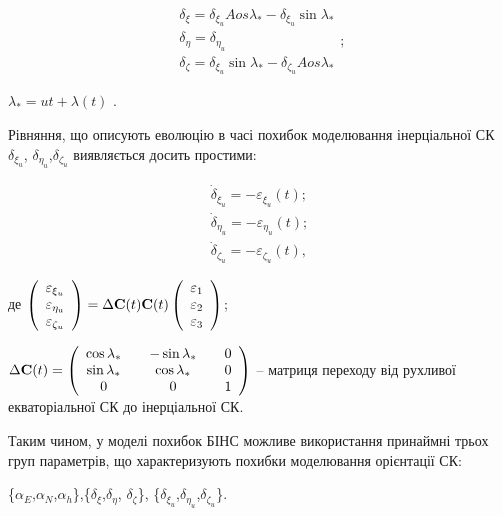 \[\begin{array}{l} 
{\delta_{\xi } =\delta_{\xi_{u} } Aos\lambda_{*} -\delta_{\xi_{u} } \sin \lambda_{*} } \\ 
{\delta_{\eta } =\delta_{\eta_{u} }} \\ 
{\delta_{\zeta } =\delta_{\xi_{u} } \sin \lambda_{*} -\delta_{\zeta_{u} } Aos\lambda_{*} } \end{array};\] 
\begin{ESKDexplanation}
  $\lambda_{*} =ut+\lambda (t)$ .
\end{ESKDexplanation}
Рівняння, що описують еволюцію в часі похибок моделювання інерціальної СК $\delta_{\xi_{u} } $,
$\delta_{\eta_{u} } $,$\delta_{\zeta_{u} } $ виявляється досить простими:

\[\begin{array}{l}{\dot{\delta }_{\xi_{u} } =-\varepsilon_{\xi_{u}} (t);} \\ 
{\dot{\delta}_{\eta_{u} } =-\varepsilon_{\eta_{u} } (t);} \\ 
{\dot{\delta}_{\zeta_{u} } =-\varepsilon_{\zeta_{u} } (t),} \end{array}\] 

де $\left(
\begin{array}{l} {\varepsilon_{\xi_{u} } } \\ 
{\varepsilon_{\eta_{{\rm u}} } } \\ 
{\varepsilon_{\zeta_{u} } } \end{array}\right)=\Delta {\bf C}(t){
\bf C}(t)\left(\begin{array}{l} {\varepsilon_{1} } \\ 
{\varepsilon_{2} } \\ 
{\varepsilon_{3} } \end{array}\right)$;

$\Delta {\bf C}(t)=\left(\begin{array}{ccccc} 
{\cos \lambda_{*} } & {} & {-\sin \lambda_{*} } & {} & {0} \\ 
{\sin \lambda_{*} } & {} & {\cos \lambda_{*} } & {} & {0} \\ 
{0} & {} & {0} & {} & {1} \end{array}\right)$ -- матриця переходу від рухливої  
екваторіальної СК до  інерціальної СК.

Таким чином, у моделі похибок БІНС можливе використання принаймні трьох груп параметрів, 
що характеризують похибки моделювання орієнтації СК:

\{$\alpha_{E} $,$\alpha_{N} $,$\alpha_{h} $\},\{$\delta_{\xi } $,$\delta_{\eta} $,
$\delta_{\zeta } $\}, \{$\delta_{\xi_{u} } $,$\delta_{\eta_{u}} $,$\delta_{\zeta_{u} } $\}.

